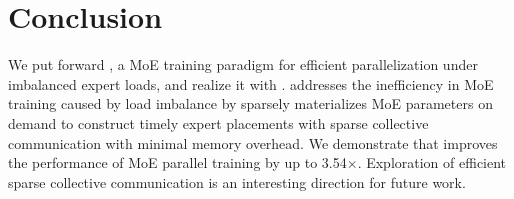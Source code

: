 \section{Conclusion}\label{sec:concl}


We put forward \yyy, a MoE training paradigm for efficient parallelization under imbalanced expert loads, and realize it with \xxx.
\yyy addresses the inefficiency in MoE training caused by load imbalance by sparsely materializes MoE parameters on demand to construct timely expert placements with sparse collective communication with minimal memory overhead.
We demonstrate that \xxx improves the performance of MoE parallel training by up to 3.54$\times$.
Exploration of efficient sparse collective communication is an interesting direction for future work.




